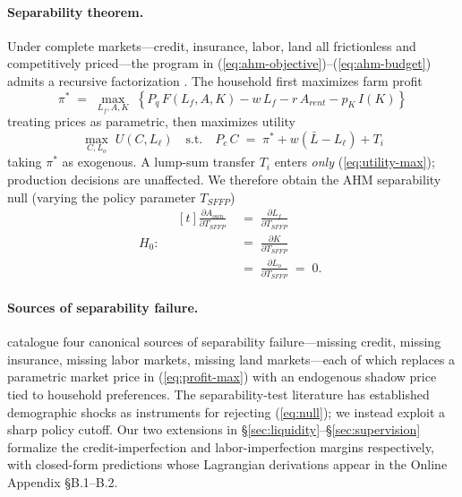 \documentclass[12pt, a4paper]{article}
\begin{document}
\paragraph{Separability theorem.} Under complete markets---credit, insurance, labor, land all frictionless and competitively priced---the program in (\ref{eq:ahm-objective})--(\ref{eq:ahm-budget}) admits a recursive factorization \citep{SinghSquireStrauss1986_ahm}. The household first maximizes farm profit
\begin{equation}
\pi^* \;=\; \max_{L_f, A, K} \; \left\{ P_q\, F(L_f, A, K) - w\, L_f - r\, A_{rent} - p_K\, I(K) \right\}
\label{eq:profit-max}
\end{equation}
treating prices as parametric, then maximizes utility
\begin{equation}
\max_{C, L_o} \; U(C, L_\ell) \quad \text{s.t.} \quad P_c\, C \;=\; \pi^* + w(\bar L - L_\ell) + T_i
\label{eq:utility-max}
\end{equation}
taking $\pi^*$ as exogenous. A lump-sum transfer $T_i$ enters \emph{only} (\ref{eq:utility-max}); production decisions are unaffected. We therefore obtain the AHM separability null (varying the policy parameter $T_{SFFP}$)
\begin{equation}
H_0: \quad \begin{aligned}[t]
  \frac{\partial A_{own}}{\partial T_{SFFP}}
  \;&=\; \frac{\partial L_f}{\partial T_{SFFP}} \\
  \;&=\; \frac{\partial K}{\partial T_{SFFP}} \\
  \;&=\; \frac{\partial L_o}{\partial T_{SFFP}} \;=\; 0.
\end{aligned}
\label{eq:null}
\end{equation}

\paragraph{Sources of separability failure.} \citet{deJanvryFafchampsSadoulet1991_peasant} catalogue four canonical sources of separability failure---missing credit, missing insurance, missing labor markets, missing land markets---each of which replaces a parametric market price in (\ref{eq:profit-max}) with an endogenous shadow price tied to household preferences. The separability-test literature \citep{Benjamin1992_separation, LaFaveThomas2016_markets} has established demographic shocks as instruments for rejecting (\ref{eq:null}); we instead exploit a sharp policy cutoff. Our two extensions in \S\ref{sec:liquidity}--\S\ref{sec:supervision} formalize the credit-imperfection and labor-imperfection margins respectively, with closed-form predictions whose Lagrangian derivations appear in the Online Appendix \S B.1--B.2.
\end{document}
